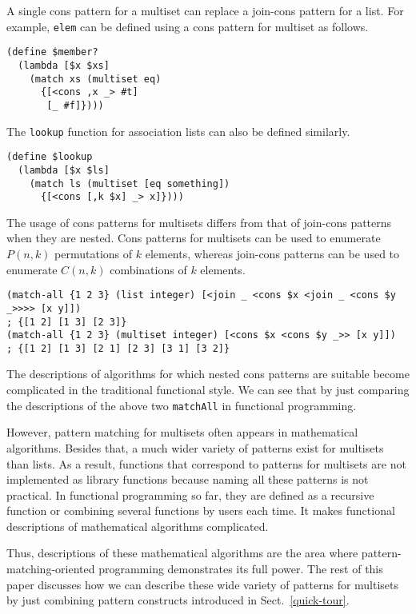 \documentclass{article}
\begin{document}
A single cons pattern for a multiset can replace a join-cons pattern for a list.
For example, \texttt{elem} can be defined using a cons pattern for multiset as follows.

{\footnotesize
\begin{lstlisting}[language=egison]
(define $member?
  (lambda [$x $xs]
    (match xs (multiset eq)
      {[<cons ,x _> #t]
       [_ #f]})))
\end{lstlisting}
}

\noindent The \texttt{lookup} function for association lists can also be defined similarly.

{\footnotesize
\begin{lstlisting}[language=egison]
(define $lookup
  (lambda [$x $ls]
    (match ls (multiset [eq something])
      {[<cons [,k $x] _> x]})))
\end{lstlisting}
}

The usage of cons patterns for multisets differs from that of join-cons patterns when they are nested.
Cons patterns for multisets can be used to enumerate $P(n,k)$ permutations of $k$ elements, whereas join-cons patterns can be used to enumerate $C(n,k)$ combinations of $k$ elements.

{\footnotesize
\begin{lstlisting}[language=egison]
(match-all {1 2 3} (list integer) [<join _ <cons $x <join _ <cons $y _>>>> [x y]])
; {[1 2] [1 3] [2 3]}
(match-all {1 2 3} (multiset integer) [<cons $x <cons $y _>> [x y]])
; {[1 2] [1 3] [2 1] [2 3] [3 1] [3 2]}
\end{lstlisting}
}

\noindent The descriptions of algorithms for which nested cons patterns are suitable become complicated in the traditional functional style.
We can see that by just comparing the descriptions of the above two \texttt{matchAll} in functional programming.

However, pattern matching for multisets often appears in mathematical algorithms.
Besides that, a much wider variety of patterns exist for multisets than lists.
As a result, functions that correspond to patterns for multisets are not implemented as library functions because naming all these patterns is not practical.
In functional programming so far, they are defined as a recursive function or combining several functions by users each time.
It makes functional descriptions of mathematical algorithms complicated.

Thus, descriptions of these mathematical algorithms are the area where pattern-matching-oriented programming demonstrates its full power.
The rest of this paper discusses how we can describe these wide variety of patterns for multisets by just combining pattern constructs introduced in Sect.~\ref{quick-tour}.
\end{document}
